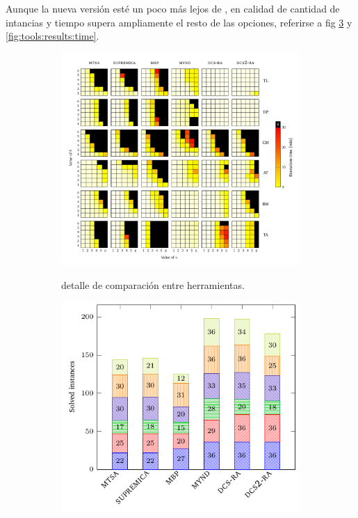 Aunque la nueva versión esté un poco más lejos de \MYND, en calidad de cantidad de intancias y tiempo supera ampliamente el resto de las opciones, referirse a fig \ref{fig:tools:results:instances} y \ref{fig:tools:results:time}.
\begin{figure}[th]
    \centering
    \hspace*{-20mm}
    \begin{subfigure}{0.7\textwidth}
        \includegraphics[width=\linewidth]{figures/benchmark/tools_vs.pdf}\label{fig:tools:results:detailed}
        \caption{detalle de comparación entre herramientas.}
    \end{subfigure}%
    \begin{subfigure}{0.5\textwidth}
        \includegraphics[width=0.9\linewidth]{figures/benchmark/tools_instances.pdf}\label{fig:tools:results:instances}

\end{subfigure}
\end{figure}
